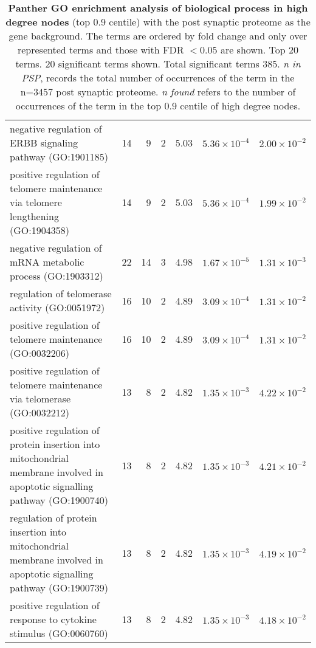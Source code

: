 \begin{table}[ht]
\begin{adjustbox}{width=\textwidth}
\begin{tabular}{lrrrlrr}
  negative regulation of ERBB signaling pathway (GO:1901185) & 14 & 9 & 2 & 5.03 & $5.36 \times 10^{-4}$ & $2.00 \times 10^{-2}$ \\ 
  positive regulation of telomere maintenance via telomere lengthening (GO:1904358) & 14 & 9 & 2 & 5.03 & $5.36 \times 10^{-4}$ & $1.99 \times 10^{-2}$ \\ 
  negative regulation of mRNA metabolic process (GO:1903312) & 22 & 14 & 3 & 4.98 & $1.67 \times 10^{-5}$ & $1.31 \times 10^{-3}$ \\ 
  regulation of telomerase activity (GO:0051972) & 16 & 10 & 2 & 4.89 & $3.09 \times 10^{-4}$ & $1.31 \times 10^{-2}$ \\ 
  positive regulation of telomere maintenance (GO:0032206) & 16 & 10 & 2 & 4.89 & $3.09 \times 10^{-4}$ & $1.31 \times 10^{-2}$ \\ 
  positive regulation of telomere maintenance via telomerase (GO:0032212) & 13 & 8 & 2 & 4.82 & $1.35 \times 10^{-3}$ & $4.22 \times 10^{-2}$ \\ 
  positive regulation of protein insertion into mitochondrial membrane involved in apoptotic signalling pathway (GO:1900740) & 13 & 8 & 2 & 4.82 & $1.35 \times 10^{-3}$ & $4.21 \times 10^{-2}$ \\ 
  regulation of protein insertion into mitochondrial membrane involved in apoptotic signalling pathway (GO:1900739) & 13 & 8 & 2 & 4.82 & $1.35 \times 10^{-3}$ & $4.19 \times 10^{-2}$ \\ 
  positive regulation of response to cytokine stimulus (GO:0060760) & 13 & 8 & 2 & 4.82 & $1.35 \times 10^{-3}$ & $4.18 \times 10^{-2}$ \\ 
   \hline
\end{tabular}
\end{adjustbox}
\caption{\textbf{Panther GO enrichment analysis of biological process in high degree nodes} (top 0.9 centile) with the post synaptic proteome as the gene background. The terms are ordered by fold change and only over represented terms and those with FDR $<0.05$ are shown. Top 20 terms. 20 significant terms shown. Total significant terms 385. \textit{n in PSP}, records the total number of occurrences of the term in the n=3457 post synaptic proteome. \textit{n found} refers to the number of occurrences of the term in the top 0.9 centile of high degree nodes.} 
\label{tab:GO biological process complete BP 3457 90cent deg.txt ordered by fold change. Over representation only. Top 20 terms. 20 significant terms shown. Total significant terms 385}
\end{table}







